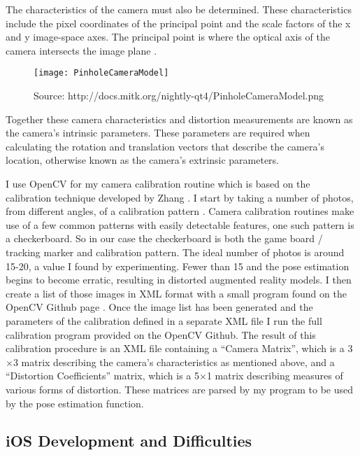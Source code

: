 \documentclass{article}
\begin{document}
The characteristics of the camera must also be determined. These characteristics include the pixel coordinates of the principal point and the scale factors of the x and y image-space axes. The principal point is where the optical axis of the camera intersects the image plane \cite{wikicalib}.

\vspace*{2\baselineskip}

\begin{figure}[H]
\begin{center}
\texttt{[image: PinholeCameraModel]}
\caption{Source: http://docs.mitk.org/nightly-qt4/PinholeCameraModel.png}
\end{center}
\end{figure}

Together these camera characteristics and distortion measurements are known as the camera's intrinsic parameters. These parameters are required when calculating the rotation and translation vectors that describe the camera's location, otherwise known as the camera's extrinsic parameters. \par

I use OpenCV for my camera calibration routine which is based on the calibration technique developed by Zhang \cite{zhang}. I start by taking a number of photos, from different angles, of a calibration pattern \cite{calib2}. Camera calibration routines make use of a few common patterns with easily detectable features, one such pattern is a checkerboard. So in our case the checkerboard is both the game board / tracking marker and calibration pattern. The ideal number of photos is around 15-20, a value I found by experimenting. Fewer than 15 and the pose estimation begins to become erratic, resulting in distorted augmented reality models. I then create a list of those images in XML format with a small program found on the OpenCV Github page \cite{opencvGit}. Once the image list has been generated and the parameters of the calibration defined in a separate XML file I run the full calibration program provided on the OpenCV Github. The result of this calibration procedure is an XML file containing a “Camera Matrix”, which is a 3$\times$3 matrix describing the camera's characteristics as mentioned above, and a “Distortion Coefficients” matrix, which is a 5$\times$1 matrix describing measures of various forms of distortion. These matrices are parsed by my program to be used by the pose estimation function. 


\subsection{iOS Development and Difficulties}
\end{document}
